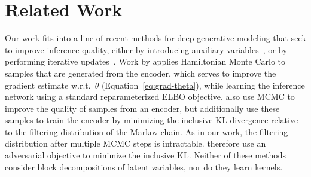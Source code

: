 \documentclass{article}
\theoremstyle{definition}
\begin{document}
\vspace{-1.5em}
\section{Related Work}
\vspace{-0.25em}

Our work fits into a line of recent methods for deep generative modeling that seek to improve inference quality, either by introducing auxiliary variables~\cite{maaloe2016auxiliary, ranganath2016hierarchical}, or by performing iterative updates~\cite{marino2018iterative}. 
Work by \citet{hoffman2017learning} applies Hamiltonian Monte Carlo to samples that are generated from the encoder, which serves to improve the gradient estimate w.r.t.~$\theta$ (Equation~\ref{eq:grad-theta}), while learning the inference network using a standard reparameterized ELBO objective. 
\citet{li2017approximate} also use MCMC to improve the quality of samples from an encoder, but additionally use these samples to train the encoder by minimizing the inclusive KL divergence relative to the filtering distribution of the Markov chain. As in our work, the filtering distribution after multiple MCMC steps is intractable. \citet{li2017approximate} therefore use an adversarial objective to minimize the inclusive KL. 
Neither of these methods consider block decompositions of latent variables, nor do they learn kernels. 
\end{document}
